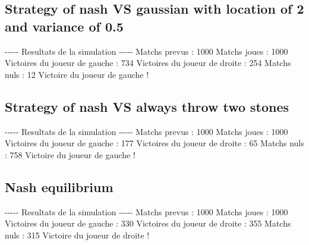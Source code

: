 \documentclass{article}%
\begin{document}
%
\subsection{Strategy of nash VS gaussian with location of 2 and variance of 0.5}%
\label{subsec:Strategy of nash VS gaussian with location of 2 and variance of 0.5}%
{-}{-}{-}{-}{-} Resultats de la simulation {-}{-}{-}{-}{-}\newline%
		\newline%
Matchs prevus : 1000\newline%
Matchs joues : 1000\newline%
\newline%
Victoires du joueur de gauche : 734\newline%
Victoires du joueur de droite : 254\newline%
Matchs nuls : 12\newline%
\newline%
Victoire du joueur de gauche !

%
\subsection{Strategy of nash VS always throw two stones}%
\label{subsec:Strategy of nash VS always throw two stones}%
{-}{-}{-}{-}{-} Resultats de la simulation {-}{-}{-}{-}{-}\newline%
		\newline%
Matchs prevus : 1000\newline%
Matchs joues : 1000\newline%
\newline%
Victoires du joueur de gauche : 177\newline%
Victoires du joueur de droite : 65\newline%
Matchs nuls : 758\newline%
\newline%
Victoire du joueur de gauche !

%
\subsection{Nash equilibrium}%
\label{subsec:Nash equilibrium}%
{-}{-}{-}{-}{-} Resultats de la simulation {-}{-}{-}{-}{-}\newline%
		\newline%
Matchs prevus : 1000\newline%
Matchs joues : 1000\newline%
\newline%
Victoires du joueur de gauche : 330\newline%
Victoires du joueur de droite : 355\newline%
Matchs nuls : 315\newline%
\newline%
Victoire du joueur de droite !

%
\end{document}
